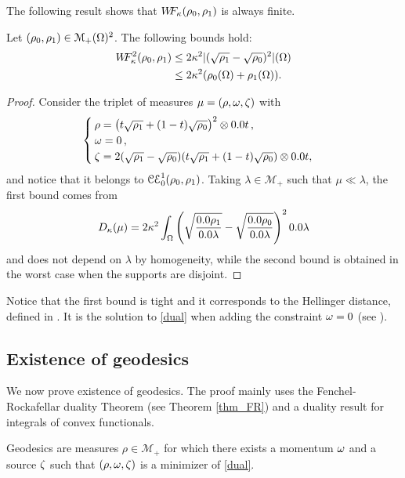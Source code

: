 The following result shows that $W\! \! F_{\kappa}(\rho_0,\rho_1)$ is always finite. 

\begin{proposition}
Let $(\rho_0,\rho_1)\in\mathcal{M}_+(\Omega)^2$. The following bounds hold:
\begin{align*}
W\! \! F^2_{\kappa}(\rho_0,\rho_1) & \leq 2\kappa^2 \vert (\sqrt{\rho_1} -\sqrt{\rho_0})^2 \vert(\Omega) \\
&\leq 2\kappa^2(\rho_0(\Omega)+\rho_1(\Omega)).
\end{align*}
\end{proposition}

\begin{proof}
Consider the triplet of measures $\mu=(\rho,\omega,\zeta)$ with
\[
\begin{cases}
\rho =  \left( t\sqrt{\rho_1}+(1-t)\sqrt{\rho_0} \right)^2  \otimes \d t \, ,\\
\M = 0\, , \\
\Z = 2(\sqrt{\rho_1}-\sqrt{\rho_0})(t\sqrt{\rho_1}+(1-t)\sqrt{\rho_0}) \otimes \d t  ,
\end{cases}
\]
and notice that it belongs to $\mathcal{CE}_0^1(\rho_0,\rho_1)$.  Taking $\lambda \in \mathcal{M}_+$ such that $\mu \ll \lambda$, the first bound comes from
 \[
 \ifonc(\mu)= 2 \kappa^2 \int_{\Om} \left( \sqrt{\frac{\d\rho_1}{\d\lambda}} -  \sqrt{\frac{\d\rho_0}{\d\lambda}}\right)^2 \d\lambda
 \]
 and does not depend on $\lambda$ by homogeneity, while the second bound is obtained in the worst case when the supports are disjoint.
 \end{proof}

\begin{remark}
Notice that the first bound is tight and it corresponds to the Hellinger distance, defined in . It is the solution to \eqref{dual}  when adding the constraint $\omega=0$ (see ).
\end{remark}

\subsection{Existence of geodesics}
We now prove existence of geodesics. The proof mainly uses the Fenchel-Rockafellar duality Theorem (see Theorem \ref{thm_FR}) and a duality result for integrals of convex functionals.

\begin{definition}[Geodesics]
Geodesics are measures $\rho \in \mathcal{M}_+$ for which there exists a momentum $\omega$ and a source $\zeta$ such that $(\rho,\omega,\zeta)$ is a minimizer of \eqref{dual}.
\end{definition}

